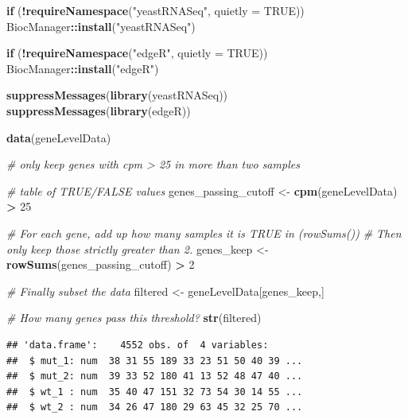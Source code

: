 \documentclass[
]{book}
\newenvironment{Shaded}{\begin{snugshade}}{\end{snugshade}}
\newcommand{\AttributeTok}[1]{\textcolor[rgb]{0.13,0.29,0.53}{#1}}
\newcommand{\CommentTok}[1]{\textcolor[rgb]{0.56,0.35,0.01}{\textit{#1}}}
\newcommand{\ConstantTok}[1]{\textcolor[rgb]{0.56,0.35,0.01}{#1}}
\newcommand{\ControlFlowTok}[1]{\textcolor[rgb]{0.13,0.29,0.53}{\textbf{#1}}}
\newcommand{\DecValTok}[1]{\textcolor[rgb]{0.00,0.00,0.81}{#1}}
\newcommand{\FunctionTok}[1]{\textcolor[rgb]{0.13,0.29,0.53}{\textbf{#1}}}
\newcommand{\NormalTok}[1]{#1}
\newcommand{\OtherTok}[1]{\textcolor[rgb]{0.56,0.35,0.01}{#1}}
\newcommand{\SpecialCharTok}[1]{\textcolor[rgb]{0.81,0.36,0.00}{\textbf{#1}}}
\newcommand{\StringTok}[1]{\textcolor[rgb]{0.31,0.60,0.02}{#1}}
\begin{document}
\begin{Shaded}
\begin{Highlighting}[]
\ControlFlowTok{if}\NormalTok{ (}\SpecialCharTok{!}\FunctionTok{requireNamespace}\NormalTok{(}\StringTok{"yeastRNASeq"}\NormalTok{, }\AttributeTok{quietly =} \ConstantTok{TRUE}\NormalTok{)) }
\NormalTok{  BiocManager}\SpecialCharTok{::}\FunctionTok{install}\NormalTok{(}\StringTok{"yeastRNASeq"}\NormalTok{)}

\ControlFlowTok{if}\NormalTok{ (}\SpecialCharTok{!}\FunctionTok{requireNamespace}\NormalTok{(}\StringTok{"edgeR"}\NormalTok{, }\AttributeTok{quietly =} \ConstantTok{TRUE}\NormalTok{)) }
\NormalTok{  BiocManager}\SpecialCharTok{::}\FunctionTok{install}\NormalTok{(}\StringTok{"edgeR"}\NormalTok{)}

\FunctionTok{suppressMessages}\NormalTok{(}\FunctionTok{library}\NormalTok{(yeastRNASeq))}
\FunctionTok{suppressMessages}\NormalTok{(}\FunctionTok{library}\NormalTok{(edgeR))}

\FunctionTok{data}\NormalTok{(geneLevelData)}

\CommentTok{\# only keep genes with cpm \textgreater{} 25 in more than two samples}

\CommentTok{\# table of TRUE/FALSE values}
\NormalTok{genes\_passing\_cutoff }\OtherTok{\textless{}{-}} \FunctionTok{cpm}\NormalTok{(geneLevelData) }\SpecialCharTok{\textgreater{}} \DecValTok{25} 

\CommentTok{\# For each gene, add up how many samples it is TRUE in (rowSums())}
\CommentTok{\# Then only keep those strictly greater than 2.}
\NormalTok{genes\_keep }\OtherTok{\textless{}{-}} \FunctionTok{rowSums}\NormalTok{(genes\_passing\_cutoff) }\SpecialCharTok{\textgreater{}} \DecValTok{2}

\CommentTok{\# Finally subset the data}
\NormalTok{filtered }\OtherTok{\textless{}{-}}\NormalTok{ geneLevelData[genes\_keep,]}

\CommentTok{\# How many genes pass this threshold?}
\FunctionTok{str}\NormalTok{(filtered)}
\end{Highlighting}
\end{Shaded}

\begin{verbatim}
## 'data.frame':    4552 obs. of  4 variables:
##  $ mut_1: num  38 31 55 189 33 23 51 50 40 39 ...
##  $ mut_2: num  39 33 52 180 41 13 52 48 47 40 ...
##  $ wt_1 : num  35 40 47 151 32 73 54 30 14 55 ...
##  $ wt_2 : num  34 26 47 180 29 63 45 32 25 70 ...
\end{verbatim}
\end{document}
